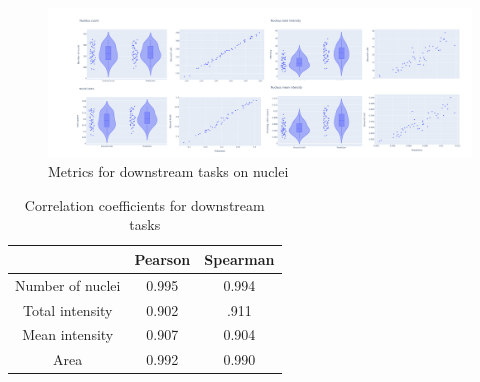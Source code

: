 \begin{figure}[H]
	\begin{center}
		\includegraphics[width=\linewidth]{bilder/nuclei/metric/combined-metrics.png}
		\caption{Metrics for downstream tasks on nuclei}\label{fig:nuclei-downstream-metrics}
	\end{center}
\end{figure}

\begin{table}[H]
    \centering
    \caption{Correlation coefficients for downstream tasks}
        \begin{adjustbox}{width=0.4\textwidth}
            \begin{tabular}{|c|c|c|}\hline
                &Pearson&Spearman
                \\\hline\hline
                Number of nuclei&0.995&0.994\\\hline
                Total intensity&0.902&.911\\\hline
                Mean intensity&0.907&0.904\\\hline
                Area&0.992&0.990\\\hline
            \end{tabular}
        \end{adjustbox}
\end{table}
